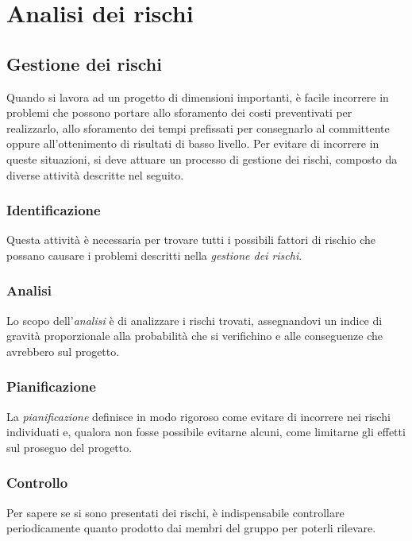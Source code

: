 \section{Analisi dei rischi}
	\subsection{Gestione dei rischi}
    Quando si lavora ad un progetto di dimensioni importanti, è facile incorrere in problemi che possono portare allo sforamento dei costi preventivati per realizzarlo, allo sforamento dei tempi prefissati per consegnarlo al committente oppure all'ottenimento di risultati di basso livello. \newline
    Per evitare di incorrere in queste situazioni, si deve attuare un processo di gestione dei rischi, composto da diverse attività descritte nel seguito.

	\subsubsection{Identificazione}
    Questa attività è necessaria per trovare tutti i possibili fattori di rischio che possano causare i problemi descritti nella \textit{gestione dei rischi}. 

	\subsubsection{Analisi}
	Lo scopo dell'\textit{analisi} è di analizzare i rischi trovati, assegnandovi un indice di gravità proporzionale alla probabilità che si verifichino e alle conseguenze che avrebbero sul progetto.

	\subsubsection{Pianificazione}
    La \textit{pianificazione} definisce in modo rigoroso come evitare di incorrere nei rischi individuati e, qualora non fosse possibile evitarne alcuni, come limitarne gli effetti sul proseguo del progetto.

	\subsubsection{Controllo} 
    Per sapere se si sono presentati dei rischi, è indispensabile controllare periodicamente quanto prodotto dai membri del gruppo per poterli rilevare.

	\newpage
		
